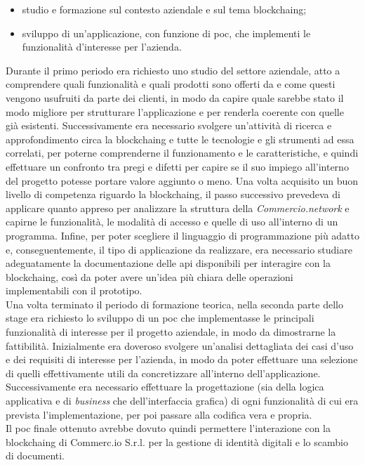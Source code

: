\begin{itemize}
	\item studio e formazione sul contesto aziendale e sul tema \gls{blockchaing};
	\item sviluppo di un'applicazione, con funzione di \gls{poc}, che implementi le funzionalità d'interesse per l'azienda.
\end{itemize}
Durante il primo periodo era richiesto uno studio del settore aziendale, atto a comprendere quali funzionalità e quali prodotti sono offerti da \myCompany{} \companyTitle{} e come questi vengono usufruiti da parte dei clienti, in modo da capire quale sarebbe stato il modo migliore per strutturare l'applicazione e per renderla coerente con quelle già esistenti. Successivamente era necessario svolgere un'attività di ricerca e approfondimento circa la \gls{blockchaing} e tutte le tecnologie e gli strumenti ad essa correlati, per poterne comprenderne il funzionamento e le caratteristiche, e quindi effettuare un confronto tra pregi e difetti per capire se il suo impiego all'interno del progetto potesse portare valore aggiunto o meno. Una volta acquisito un buon livello di competenza riguardo la \gls{blockchaing}, il passo successivo prevedeva di applicare quanto appreso per analizzare la struttura della \textit{Commercio.network} e capirne le funzionalità, le modalità di accesso e quelle di uso all'interno di un programma. Infine, per poter scegliere il linguaggio di programmazione più adatto e, conseguentemente, il tipo di applicazione da realizzare, era necessario studiare adeguatamente la documentazione delle \gls{api} disponibili per interagire con la \gls{blockchaing}, così da poter avere un'idea più chiara delle operazioni implementabili con il prototipo.\\
Una volta terminato il periodo di formazione teorica, nella seconda parte dello stage era richiesto lo sviluppo di un \gls{poc} che implementasse le principali funzionalità di interesse per il progetto aziendale, in modo da dimostrarne la fattibilità. Inizialmente era doveroso svolgere un'analisi dettagliata dei casi d'uso e dei requisiti di interesse per l'azienda, in modo da poter effettuare una selezione di quelli effettivamente utili da concretizzare all'interno dell'applicazione. Successivamente era necessario effettuare la progettazione (sia della logica applicativa e di \textit{business} che dell'interfaccia grafica) di ogni funzionalità di cui era prevista l'implementazione, per poi passare alla codifica vera e propria.\\
Il \gls{poc} finale ottenuto avrebbe dovuto quindi permettere l'interazione con la \gls{blockchaing} di Commerc.io S.r.l. per la gestione di identità digitali e lo scambio di documenti.


